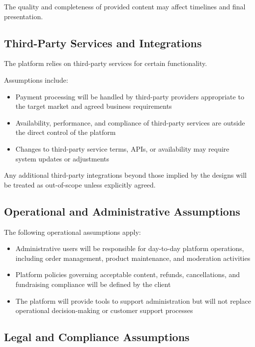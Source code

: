 The quality and completeness of provided content may affect timelines and final
presentation.

\subsection{Third-Party Services and Integrations}

The platform relies on third-party services for certain functionality.

Assumptions include:
\begin{itemize}[leftmargin=1.5em]
    \item Payment processing will be handled by third-party providers appropriate
    to the target market and agreed business requirements
    \item Availability, performance, and compliance of third-party services are
    outside the direct control of the platform
    \item Changes to third-party service terms, APIs, or availability may require
    system updates or adjustments
\end{itemize}

Any additional third-party integrations beyond those implied by the designs will
be treated as out-of-scope unless explicitly agreed.

\subsection{Operational and Administrative Assumptions}

The following operational assumptions apply:
\begin{itemize}[leftmargin=1.5em]
    \item Administrative users will be responsible for day-to-day platform
    operations, including order management, product maintenance, and moderation
    activities
    \item Platform policies governing acceptable content, refunds, cancellations,
    and fundraising compliance will be defined by the client
    \item The platform will provide tools to support administration but will not
    replace operational decision-making or customer support processes
\end{itemize}

\subsection{Legal and Compliance Assumptions}

